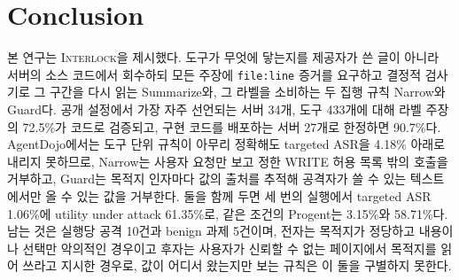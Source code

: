 \documentclass[acmsmall,screen,review,anonymous]{acmart}
\begin{document}
\section{Conclusion}
\label{sec:conclusion}

본 연구는 \textsc{Interlock}을 제시했다. 도구가 무엇에 닿는지를 제공자가 쓴 글이 아니라 서버의 소스 코드에서 회수하되 모든 주장에 \texttt{file:line} 증거를 요구하고 결정적 검사기로 그 구간을 다시 읽는 Summarize와, 그 라벨을 소비하는 두 집행 규칙 Narrow와 Guard다. 공개 설정에서 가장 자주 선언되는 서버 34개, 도구 433개에 대해 라벨 주장의 72.5\%가 코드로 검증되고, 구현 코드를 배포하는 서버 27개로 한정하면 90.7\%다. AgentDojo에서는 도구 단위 규칙이 아무리 정확해도 targeted ASR을 4.18\% 아래로 내리지 못하므로, Narrow는 사용자 요청만 보고 정한 WRITE 허용 목록 밖의 호출을 거부하고, Guard는 목적지 인자마다 값의 출처를 추적해 공격자가 쓸 수 있는 텍스트에서만 올 수 있는 값을 거부한다. 둘을 함께 두면 세 번의 실행에서 targeted ASR 1.06\%에 utility under attack 61.35\%로, 같은 조건의 Progent는 3.15\%와 58.71\%다. 남는 것은 실행당 공격 10건과 benign 과제 5건이며, 전자는 목적지가 정당하고 내용이나 선택만 악의적인 경우이고 후자는 사용자가 신뢰할 수 없는 페이지에서 목적지를 읽어 쓰라고 지시한 경우로, 값이 어디서 왔는지만 보는 규칙은 이 둘을 구별하지 못한다.



\end{document}
